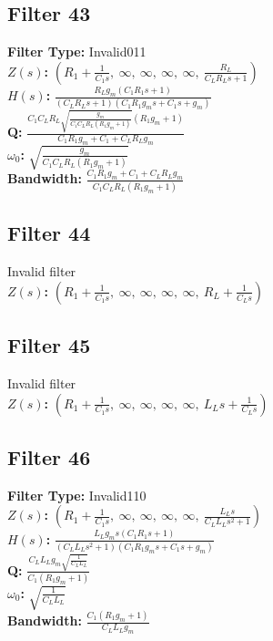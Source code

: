 \documentclass{article}
\begin{document}
\subsection*{Filter 43}
\textbf{Filter Type:} Invalid011 \\ 
\textbf{$Z(s)$:} $\left( R_{1} + \frac{1}{C_{1} s}, \  \infty, \  \infty, \  \infty, \  \infty, \  \frac{R_{L}}{C_{L} R_{L} s + 1}\right)$ \\ 
\textbf{$H(s)$:} $\frac{R_{L} g_{m} \left(C_{1} R_{1} s + 1\right)}{\left(C_{L} R_{L} s + 1\right) \left(C_{1} R_{1} g_{m} s + C_{1} s + g_{m}\right)}$ \\ 
\textbf{Q:} $\frac{C_{1} C_{L} R_{L} \sqrt{\frac{g_{m}}{C_{1} C_{L} R_{L} \left(R_{1} g_{m} + 1\right)}} \left(R_{1} g_{m} + 1\right)}{C_{1} R_{1} g_{m} + C_{1} + C_{L} R_{L} g_{m}}$ \\ 
\textbf{$\omega_0$:} $\sqrt{\frac{g_{m}}{C_{1} C_{L} R_{L} \left(R_{1} g_{m} + 1\right)}}$ \\ 
\textbf{Bandwidth:} $\frac{C_{1} R_{1} g_{m} + C_{1} + C_{L} R_{L} g_{m}}{C_{1} C_{L} R_{L} \left(R_{1} g_{m} + 1\right)}$ \\ 
\subsection*{Filter 44}
Invalid filter \\ 
\textbf{$Z(s)$:} $\left( R_{1} + \frac{1}{C_{1} s}, \  \infty, \  \infty, \  \infty, \  \infty, \  R_{L} + \frac{1}{C_{L} s}\right)$ \\ 
\subsection*{Filter 45}
Invalid filter \\ 
\textbf{$Z(s)$:} $\left( R_{1} + \frac{1}{C_{1} s}, \  \infty, \  \infty, \  \infty, \  \infty, \  L_{L} s + \frac{1}{C_{L} s}\right)$ \\ 
\subsection*{Filter 46}
\textbf{Filter Type:} Invalid110 \\ 
\textbf{$Z(s)$:} $\left( R_{1} + \frac{1}{C_{1} s}, \  \infty, \  \infty, \  \infty, \  \infty, \  \frac{L_{L} s}{C_{L} L_{L} s^{2} + 1}\right)$ \\ 
\textbf{$H(s)$:} $\frac{L_{L} g_{m} s \left(C_{1} R_{1} s + 1\right)}{\left(C_{L} L_{L} s^{2} + 1\right) \left(C_{1} R_{1} g_{m} s + C_{1} s + g_{m}\right)}$ \\ 
\textbf{Q:} $\frac{C_{L} L_{L} g_{m} \sqrt{\frac{1}{C_{L} L_{L}}}}{C_{1} \left(R_{1} g_{m} + 1\right)}$ \\ 
\textbf{$\omega_0$:} $\sqrt{\frac{1}{C_{L} L_{L}}}$ \\ 
\textbf{Bandwidth:} $\frac{C_{1} \left(R_{1} g_{m} + 1\right)}{C_{L} L_{L} g_{m}}$ \\ 
\end{document}
